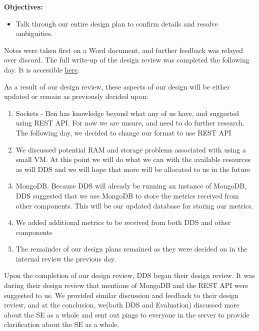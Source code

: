 \medskip

\textbf{Objectives:}
\begin{itemize}
  \item Talk through our entire design plan to confirm details and resolve ambiguities. 
\end{itemize}

Notes were taken first on a Word document, and further feedback was relayed over discord. The full write-up of the design review was completed the following day. It is accessible \href{https://docs.google.com/document/d/1REwOedsmrtoQbACQpFj3Ti8JiCDlrIysBp8OR26vRdU/edit?tab=t.0}{here}.

\medskip

As a result of our design review, these aspects of our design will be either updated or remain as previously decided upon:
\begin{enumerate}
  \item Sockets - Ben has knowledge beyond what any of us have, and suggested using REST API. For now we are unsure, and need to do further research. The following day, we decided to change our format to use REST API
  \item We discussed potential RAM and storage problems associated with using a small VM. At this point we will do what we can with the available resources as will DDS and we will hope that more will be allocated to us in the future
  \item MongoDB. Because DDS will already be running an instance of MongoDB, DDS suggested that we use MongoDB to store the metrics received from other components. This will be our updated database for storing our metrics. 
  \item We added additional metrics to be received from both DDS and other components
  \item The remainder of our design plans remained as they were decided on in the internal review the previous day.
\end{enumerate}
Upon the completion of our design review, DDS began their design review. It was during their design review that mentions of MongoDB and the REST API were suggested to us. We provided similar discussion and feedback to their design review, and at the conclusion, we(both DDS and Evaluation) discussed more about the SE as a whole and sent out pings to everyone in the server to provide clarification about the SE as a whole.
\newpage